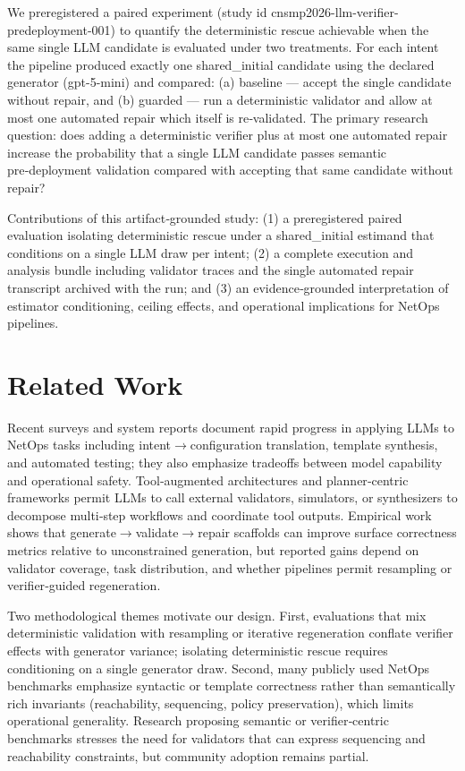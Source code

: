 \documentclass[conference]{IEEEtran}
\begin{document}
We preregistered a paired experiment (study id cnsmp2026-llm-verifier-predeployment-001) to quantify the deterministic rescue achievable when the same single LLM candidate is evaluated under two treatments. For each intent the pipeline produced exactly one shared\_initial candidate using the declared generator (gpt-5-mini) and compared: (a) baseline --- accept the single candidate without repair, and (b) guarded --- run a deterministic validator and allow at most one automated repair which itself is re‑validated. The primary research question: does adding a deterministic verifier plus at most one automated repair increase the probability that a single LLM candidate passes semantic pre‑deployment validation compared with accepting that same candidate without repair?

Contributions of this artifact‑grounded study: (1) a preregistered paired evaluation isolating deterministic rescue under a shared\_initial estimand that conditions on a single LLM draw per intent; (2) a complete execution and analysis bundle including validator traces and the single automated repair transcript archived with the run; and (3) an evidence‑grounded interpretation of estimator conditioning, ceiling effects, and operational implications for NetOps pipelines.

\section{Related Work}
Recent surveys and system reports document rapid progress in applying LLMs to NetOps tasks including intent\ensuremath{\rightarrow}configuration translation, template synthesis, and automated testing; they also emphasize tradeoffs between model capability and operational safety. Tool‑augmented architectures and planner‑centric frameworks permit LLMs to call external validators, simulators, or synthesizers to decompose multi‑step workflows and coordinate tool outputs. Empirical work shows that generate\ensuremath{\rightarrow}validate\ensuremath{\rightarrow}repair scaffolds can improve surface correctness metrics relative to unconstrained generation, but reported gains depend on validator coverage, task distribution, and whether pipelines permit resampling or verifier‑guided regeneration.

Two methodological themes motivate our design. First, evaluations that mix deterministic validation with resampling or iterative regeneration conflate verifier effects with generator variance; isolating deterministic rescue requires conditioning on a single generator draw. Second, many publicly used NetOps benchmarks emphasize syntactic or template correctness rather than semantically rich invariants (reachability, sequencing, policy preservation), which limits operational generality. Research proposing semantic or verifier‑centric benchmarks stresses the need for validators that can express sequencing and reachability constraints, but community adoption remains partial.
\end{document}
